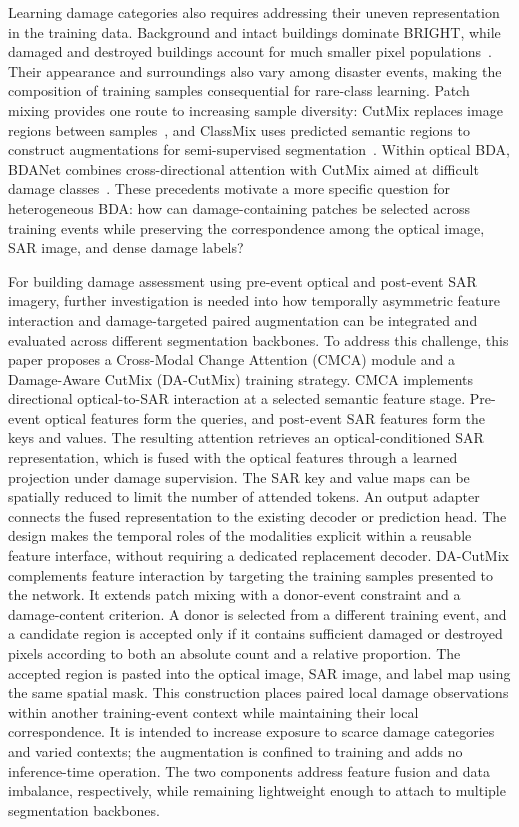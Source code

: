 \documentclass[journal]{IEEEtran}
\newcommand{\cmca}{CMCA}
\newcommand{\dacutmix}{DA-CutMix}
\begin{document}
    Learning damage categories also requires addressing their uneven representation in the training data. Background and intact buildings dominate BRIGHT, while damaged and destroyed buildings account for much smaller pixel populations~\cite{chen2025bright}. Their appearance and surroundings also vary among disaster events, making the composition of training samples consequential for rare-class learning. Patch mixing provides one route to increasing sample diversity: CutMix replaces image regions between samples~\cite{yun2019cutmix}, and ClassMix uses predicted semantic regions to construct augmentations for semi-supervised segmentation~\cite{olsson2021classmix}. Within optical BDA, BDANet combines cross-directional attention with CutMix aimed at difficult damage classes~\cite{shen2022bdanet}. These precedents motivate a more specific question for heterogeneous BDA: how can damage-containing patches be selected across training events while preserving the correspondence among the optical image, SAR image, and dense damage labels?
    
    For building damage assessment using pre-event optical and post-event SAR imagery, further investigation is needed into how temporally asymmetric feature interaction and damage-targeted paired augmentation can be integrated and evaluated across different segmentation backbones.
    To address this challenge, this paper proposes a Cross-Modal Change Attention (\cmca) module and a Damage-Aware CutMix (\dacutmix) training strategy. CMCA implements directional optical-to-SAR interaction at a selected semantic feature stage. Pre-event optical features form the queries, and post-event SAR features form the keys and values. The resulting attention retrieves an optical-conditioned SAR representation, which is fused with the optical features through a learned projection under damage supervision. The SAR key and value maps can be spatially reduced to limit the number of attended tokens. An output adapter connects the fused representation to the existing decoder or prediction head. The design makes the temporal roles of the modalities explicit within a reusable feature interface, without requiring a dedicated replacement decoder.
    DA-CutMix complements feature interaction by targeting the training samples presented to the network. It extends patch mixing with a donor-event constraint and a damage-content criterion. A donor is selected from a different training event, and a candidate region is accepted only if it contains sufficient damaged or destroyed pixels according to both an absolute count and a relative proportion. The accepted region is pasted into the optical image, SAR image, and label map using the same spatial mask. This construction places paired local damage observations within another training-event context while maintaining their local correspondence. It is intended to increase exposure to scarce damage categories and varied contexts; the augmentation is confined to training and adds no inference-time operation. The two components address feature fusion and data imbalance, respectively, while remaining lightweight enough to attach to multiple segmentation backbones.
    
\end{document}
